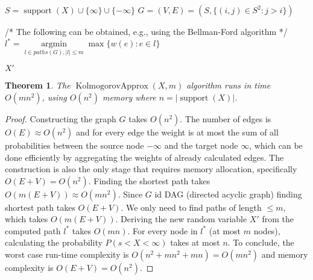\documentclass{article}
\newtheorem{theorem}{Theorem}
\DeclareMathOperator{\support}{support}
\DeclareMathOperator{\KlmApprox}{KolmogorovApprox}
\begin{document}
\begin{algorithm}\label{alg:optapprox}
	\DontPrintSemicolon
	$S = \support(X)\cup \{\infty\} \cup \{-\infty\}$\;
	$G=(V,E)=(S, \{ (i,j) \in S^2 \colon  j>i \})$ \;
	
	
	/* The following can be obtained, e.g., using the Bellman-Ford algorithm */\;
	$l^*= \operatorname{argmin}\limits_{l \in paths(G),|l|\leq m}  \max \{ w(e)\colon e \in l  \}$ \;
	
	\Return $X'$\;
	
	\caption{$\KlmApprox (X, m)$}  
	\label{alg:sequence}
\end{algorithm}

\begin{theorem}\label{the:complexity}
	The $\KlmApprox(X,m)$ algorithm runs in time $O(mn^2)$, using $O(n^2)$ memory where $n=|\support(X)|$.
\end{theorem}

\begin{proof}
	Constructing the graph $G$ takes $O(n^2)$. The number of edges is $O(E)\approx O(n^2)$ and for every edge the weight is at most the sum of all probabilities between the source node $-\infty$ and the target node $\infty$, which can be done efficiently by aggregating the weights of already calculated edges. 
	The construction is also the only stage that requires memory allocation, specifically $O(E+V)=O(n^2)$.
	Finding the shortest path takes $O(m(E+V))\approx O(mn^2)$. Since $G$ id DAG (directed acyclic graph) finding shortest path takes $O(E+V)$. We only need to find paths of length $\leq m$, which takes $O(m(E+V))$.
	Deriving the new random variable $X'$ from the computed path $l^*$ takes $O(mn)$. For every node in $l^*$ (at most $m$ nodes), calculating the probability $P(s<X<\infty)$ takes at most $n$. 
	To conclude, the worst case run-time complexity is $O(n^2+mn^2+mn)=O(mn^2)$ and memory complexity is $O(E+V)=O(n^2)$.
\end{proof}
\end{document}
